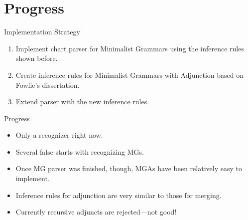 \documentclass{beamer}
\begin{document}
\section{Progress}

\begin{frame}{Implementation Strategy}
  \begin{enumerate}
  \item Implement chart parser for Minimalist Grammars using the
    inference rules shown before.
  \item Create inference rules for Minimalist Grammars with Adjunction
    based on Fowlie's dissertation.
  \item Extend parser with the new inference rules.
  \end{enumerate}
\end{frame}

\begin{frame}{Progress}
  \begin{itemize}
  \item Only a recognizer right now.
  \item Several false starts with recognizing MGs.
  \item Once MG parser was finished, though, MGAs have been relatively
    easy to implement.
  \item Inference rules for adjunction are very similar to those for
    merging.
  \item Currently recursive adjuncts are rejected---not good!
  \end{itemize}
\end{frame}
\end{document}
